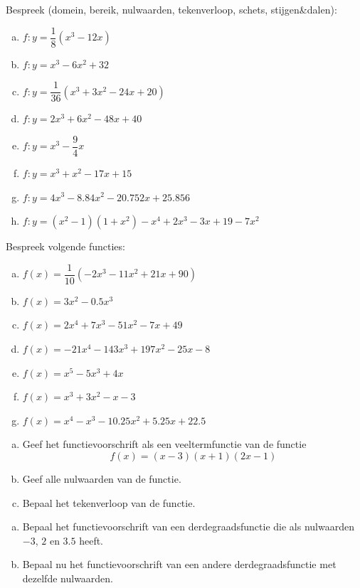 \documentclass[12pt]{article}
\begin{document}
\begin{oefening}
Bespreek (domein, bereik, nulwaarden, tekenverloop, schets, stijgen\&dalen):\\
\begin{enumerate}[(a)]
  \itemsep1em
  \item $f:y=\dfrac{1}{8}(x^3-12x)$
  \item $f:y=x^3-6x^2+32$
  \item $f:y=\dfrac{1}{36}(x^3+3x^2-24x+20)$
  \item $f:y=2x^3+6x^2-48x+40$
  \item $f:y=x^3-\dfrac{9}{4}x$
  \item $f:y=x^3+x^2-17x+15$
  \item $f:y=4x^3-8.84x^2-20.752x+25.856$
  \item $f:y=(x^2-1)(1+x^2)-x^4+2x^3-3x+19-7x^2$
\end{enumerate}
\end{oefening}

\begin{oefening}
  Bespreek volgende functies:
  \begin{enumerate}[(a)]
  \itemsep.5em
  \item $f(x)=\dfrac{1}{10}(-2x^3-11x^2+21x+90)$
  \item $f(x)=3x^2-0.5x^3$
  \item $f(x)=2x^4+7x^3-51x^2-7x+49$
  \item $f(x)=-21x^4-143x^3+197x^2-25x-8$
  \item $f(x)=x^5-5x^3+4x$
  \item $f(x)=x^3+3x^2-x-3$
  \item $f(x)=x^4-x^3-10.25x^2+5.25x+22.5$
  \end{enumerate}
\end{oefening}

\begin{oefening}
\begin{enumerate}[(a)]
  \item Geef het functievoorschrift als een veeltermfunctie van de functie
$$f(x)=(x-3)(x+1)(2x-1)$$
  \item Geef alle nulwaarden van de functie.
  \item Bepaal het tekenverloop van de functie.
\end{enumerate}
\end{oefening}

\begin{oefening}
\begin{enumerate}[(a)]
  \item Bepaal het functievoorschrift van een derdegraadsfunctie die als nulwaarden $-3$, $2$ en $3.5$ heeft.
  \item Bepaal nu het functievoorschrift van een andere derdegraadsfunctie met dezelfde nulwaarden.
\end{enumerate}
\end{oefening}
\end{document}
